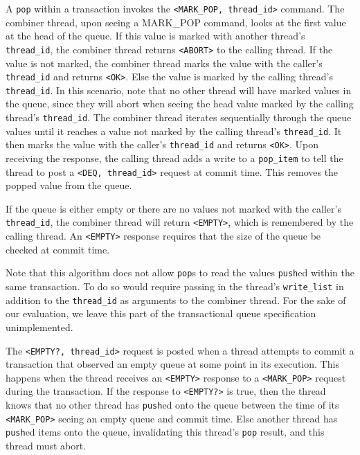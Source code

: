 A \texttt{pop} within a transaction invokes the \texttt{<MARK\_POP, thread\_id>} command. The combiner thread, upon seeing a MARK\_POP command, looks at the first value at the head of the queue. If this value is marked with another thread’s \texttt{thread\_id}, the combiner thread returns \texttt{<ABORT>} to the calling thread. If the value is not marked, the combiner thread marks the value with the caller’s \texttt{thread\_id} and returns \texttt{<OK>}. Else the value is marked by the calling thread’s \texttt{thread\_id}. In this scenario, note that no other thread will have marked values in the queue, since they will abort when seeing the head value marked by the calling thread’s \texttt{thread\_id}. The combiner thread iterates sequentially through the queue values until it reaches a value not marked by the calling thread’s \texttt{thread\_id}. It then marks the value with the caller’s \texttt{thread\_id} and returns \texttt{<OK>}. Upon receiving the response, the calling thread adds a write to a \texttt{pop\_item} to tell the thread to post a \texttt{<DEQ, thread\_id>} request at commit time. This removes the popped value from the queue.

If the queue is either empty or there are no values not marked with the caller’s \texttt{thread\_id}, the combiner thread will return \texttt{<EMPTY>}, which is remembered by the calling thread. An \texttt{<EMPTY>} response requires that the size of the queue be checked at commit time.

Note that this algorithm does not allow \texttt{pop}s to read the values \texttt{push}ed within the same transaction. To do so would require passing in the thread’s \texttt{write\_list} in addition to the \texttt{thread\_id} as arguments to the combiner thread. For the sake of our evaluation, we leave this part of the transactional queue specification unimplemented.

The \texttt{<EMPTY?, thread\_id>} request is posted when a thread attempts to commit a transaction that observed an empty queue at some point in its execution. This happens when the thread receives an \texttt{<EMPTY>} response to a \texttt{<MARK\_POP>} request during the transaction. If the response to \texttt{<EMPTY?>} is true, then the thread knows that no other thread has \texttt{push}ed onto the queue between the time of its \texttt{<MARK\_POP>} seeing an empty queue and commit time. Else another thread has \texttt{push}ed items onto the queue, invalidating this thread’s \texttt{pop} result, and this thread must abort.

